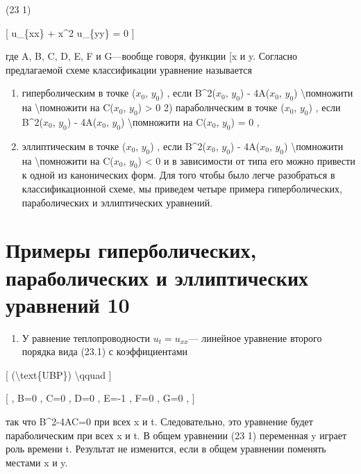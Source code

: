 \documentclass[
]{article}
\providecommand{\tightlist}{%
  \setlength{\itemsep}{0pt}\setlength{\parskip}{0pt}}
\begin{document}
(23 1)

{[} u\_\{xx\} + x\^{}2 u\_\{yy\} = 0 {]}

где A, B, C, D, E, F и G---вообще говоря, функции {[}x и y. Согласно
предлагаемой схеме классификации уравнение называется

\begin{enumerate}
\def\labelenumi{\arabic{enumi})}
\item
  гиперболическим в точке (\(x_0\), \(y_0\)) , если B\^{}2(\(x_0\),
  \(y_0\)) - 4A(\(x_0\), \(y_0\)) \textbackslash помножити на
  \textbackslash помножити на C(\(x_0\), \(y_0\)) \textgreater{} 0 2)
  параболнческим в точке (\(x_0\), \(y_0\)) , если B\^{}2(\(x_0\),
  \(y_0\)) - 4A(\(x_0\), \(y_0\)) \textbackslash помножити на C(\(x_0\),
  \(y_0\)) = 0 ,
\item
  эллиптическим в точке (\(x_0\), \(y_0\)) , если B\^{}2(\(x_0\),
  \(y_0\)) - 4A(\(x_0\), \(y_0\)) \textbackslash помножити на
  \textbackslash помножити на C(\(x_0\), \(y_0\)) \textless{} 0 и в
  зависимости от типа его можно привести к одной из канонических форм.
  Для того чтобы было легче разобраться в классификационной схеме, мы
  приведем четыре примера гиперболических, параболических и
  эллиптических уравнений.
\end{enumerate}

\section{Примеры гиперболических, параболических и эллиптических
уравнений
10}\label{ux43fux440ux438ux43cux435ux440ux44b-ux433ux438ux43fux435ux440ux431ux43eux43bux438ux447ux435ux441ux43aux438ux445-ux43fux430ux440ux430ux431ux43eux43bux438ux447ux435ux441ux43aux438ux445-ux438-ux44dux43bux43bux438ux43fux442ux438ux447ux435ux441ux43aux438ux445-ux443ux440ux430ux432ux43dux435ux43dux438ux439-10}

\begin{enumerate}
\def\labelenumi{\arabic{enumi}.}
\tightlist
\item
  У равнение теплопроводности \(u_t = u_{xx}\)--- линейное уравнение
  второго порядка вида (23.1) с коэффициентами
\end{enumerate}

{[} (\textbackslash text\{UBP\}) \textbackslash qquad {]}

{[} , B=0 , C=0 , D=0 , E=-1 , F=0 , G=0 , {]}

так что B\^{}2-4AC=0 при всех x и t. Следовательно, это уравнение будет
параболическим при всех x и t. В общем уравнении (23 1) переменная y
играет роль времени t. Результат не изменится, если в общем уравнении
поменять местами x и y.
\end{document}

